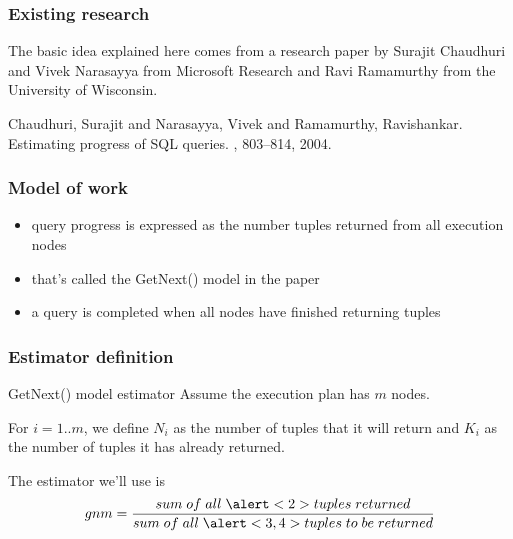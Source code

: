 \documentclass{beamer}
\begin{document}
\begin{frame}
  \frametitle{Existing research}

  The basic idea explained here comes from a research paper by Surajit
  Chaudhuri and Vivek Narasayya from Microsoft Research and Ravi Ramamurthy
  from the University of Wisconsin.

  \bigskip

  \begin{thebibliography}{Chaudhuri 2004}

    Chaudhuri, Surajit and Narasayya, Vivek and Ramamurthy, Ravishankar.
    \newblock Estimating progress of SQL queries.
    , 803--814, 2004.

  \end{thebibliography}
\end{frame}

\begin{frame}
  \frametitle{Model of work}

  \begin{itemize}
  \item query progress is expressed as the number tuples returned from all
    execution nodes
  \item that's called the GetNext() model in the paper
  \item a query is completed when all nodes have finished returning tuples
  \end{itemize}
\end{frame}

\begin{frame}
  \frametitle{Estimator definition}

  \begin{block}{GetNext() model estimator}
    Assume the execution plan has $m$ nodes.

    \bigskip

    For $i = 1..m$, we define \alert<3,4>{$N_{i}$} as the number of tuples that
    it \alert<3>{will return} and \alert<2>{$K_{i}$} as the number of tuples it
    \alert<2>{has already returned}.

    \bigskip

    The estimator we'll use is
    \begin{equation*}
      gnm = \frac{sum\;of\;all\;\alert<2>{tuples\;returned}}
      {sum\;of\;all\;\alert<3,4>{tuples\;to\;be\;returned}}
    \end{equation*}

    \bigskip

  \end{block}
\end{frame}
\end{document}
